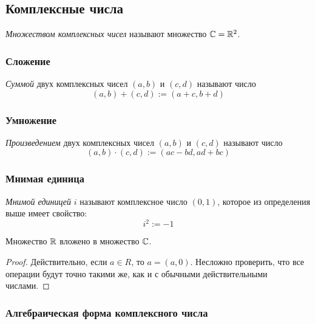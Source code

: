 \subsection{Комплексные числа}

\begin{definition}
    \textit{Множеством комплексных чисел} называют множество $\mathbb{C} = \mathbb{R}^2$.
\end{definition}

\subsubsection*{Сложение}

\begin{definition}
    \textit{Суммой} двух комплексных чисел $(a, b)$ и $(c, d)$ называют число
    \[
        (a, b) + (c, d) := (a + c, b + d)
    \]
\end{definition}

\subsubsection*{Умножение}

\begin{definition}
    \textit{Произведением} двух комплексных чисел $(a, b)$ и $(c, d)$ называют число
    \[
        (a, b) \cdot (c, d) := (ac - bd, ad + bc)
    \]
\end{definition}

\subsubsection*{Мнимая единица}

\begin{definition}
    \textit{Мнимой единицей} $i$ называют комплексное число $(0, 1)$, которое из определения выше имеет свойство:
    \[
        i^2 := -1
    \]
\end{definition}

\begin{proposition}
    Множество $\mathbb{R}$ вложено в множество $\mathbb{C}$.
\end{proposition}

\begin{proof}
    Действительно, если $a \in R$, то $a = (a, 0)$. Несложно проверить, что все операции будут точно такими же, как и с обычными действительными числами.
\end{proof}

\subsubsection*{Алгебраическая форма комплексного числа}


